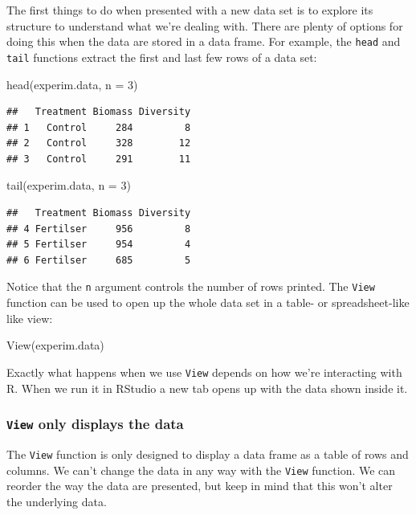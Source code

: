 \documentclass[
]{book}
\newenvironment{Shaded}{\begin{snugshade}}{\end{snugshade}}
\newcommand{\AttributeTok}[1]{\textcolor[rgb]{0.77,0.63,0.00}{#1}}
\newcommand{\DecValTok}[1]{\textcolor[rgb]{0.00,0.00,0.81}{#1}}
\newcommand{\FunctionTok}[1]{\textcolor[rgb]{0.00,0.00,0.00}{#1}}
\newcommand{\NormalTok}[1]{#1}
\newenvironment{greybox}{
  \definecolor{shadecolor}{rgb}{0.95,0.95,0.95}  %
  \color{black}
  \begin{shaded}}
 {\end{shaded}}
\newenvironment{infobox}[1]
  {
  \begin{itemize}
  \renewcommand{\labelitemi}{
    \raisebox{-.7\height}[0pt][0pt]{
      {\setkeys{Gin}{width=3em,keepaspectratio}
        \texttt{[image: images/\#1]}}
    }
  }
  \setlength{\fboxsep}{1em}
  \begin{greybox}
  \item
  }
  {
  \end{greybox}
  \end{itemize}
  }
\begin{document}
The first things to do when presented with a new data set is to explore its structure to understand what we're dealing with. There are plenty of options for doing this when the data are stored in a data frame. For example, the \texttt{head} and \texttt{tail} functions extract the first and last few rows of a data set:

\begin{Shaded}
\begin{Highlighting}[]
\FunctionTok{head}\NormalTok{(experim.data, }\AttributeTok{n =} \DecValTok{3}\NormalTok{)}
\end{Highlighting}
\end{Shaded}

\begin{verbatim}
##   Treatment Biomass Diversity
## 1   Control     284         8
## 2   Control     328        12
## 3   Control     291        11
\end{verbatim}

\begin{Shaded}
\begin{Highlighting}[]
\FunctionTok{tail}\NormalTok{(experim.data, }\AttributeTok{n =} \DecValTok{3}\NormalTok{)}
\end{Highlighting}
\end{Shaded}

\begin{verbatim}
##   Treatment Biomass Diversity
## 4 Fertilser     956         8
## 5 Fertilser     954         4
## 6 Fertilser     685         5
\end{verbatim}

Notice that the \texttt{n} argument controls the number of rows printed. The \texttt{View} function can be used to open up the whole data set in a table- or spreadsheet-like like view:

\begin{Shaded}
\begin{Highlighting}[]
\FunctionTok{View}\NormalTok{(experim.data)}
\end{Highlighting}
\end{Shaded}

Exactly what happens when we use \texttt{View} depends on how we're interacting with R. When we run it in RStudio a new tab opens up with the data shown inside it.

\begin{infobox}{warning}

\hypertarget{view-only-displays-the-data}{%
\subsubsection*{\texorpdfstring{\texttt{View} only displays the data}{View only displays the data}}\label{view-only-displays-the-data}}

The \texttt{View} function is only designed to display a data frame as a table of rows and columns. We can't change the data in any way with the \texttt{View} function. We can reorder the way the data are presented, but keep in mind that this won't alter the underlying data.

\end{infobox}
\end{document}
